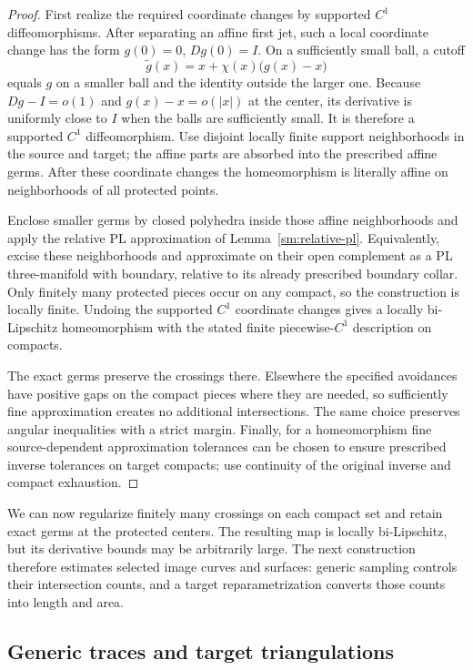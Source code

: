 \begin{proof}
First realize the required coordinate changes by supported $C^1$
diffeomorphisms.  After separating an affine first jet, such a local
coordinate change has the form $g(0)=0$, $Dg(0)=I$.  On a sufficiently
small ball, a cutoff
\[
 \widetilde g(x)=x+\chi(x)\bigl(g(x)-x\bigr)
\]
equals $g$ on a smaller ball and the identity outside the larger one.
Because $Dg-I=o(1)$ and $g(x)-x=o(|x|)$ at the center, its derivative
is uniformly close to $I$ when the balls are sufficiently small.
It is therefore a supported $C^1$ diffeomorphism.  Use disjoint
locally finite support neighborhoods in the source and target;
the affine parts are absorbed into the prescribed affine germs.
After these coordinate changes the homeomorphism is literally
affine on neighborhoods of all protected points.

Enclose smaller germs by closed polyhedra inside those affine
neighborhoods and apply the relative PL approximation of
Lemma~\ref{sm:relative-pl}.  Equivalently, excise these neighborhoods
and approximate on their open complement as a PL three-manifold
with boundary, relative to its already prescribed boundary collar.
Only finitely many protected pieces occur on any compact, so the
construction is locally finite.  Undoing the supported $C^1$
coordinate changes gives a locally bi-Lipschitz homeomorphism
with the stated finite piecewise-$C^1$ description on compacts.

The exact germs preserve the crossings there.  Elsewhere the
specified avoidances have positive gaps on the compact pieces
where they are needed, so sufficiently fine approximation creates
no additional intersections.  The same choice preserves angular
inequalities with a strict margin.  Finally, for a homeomorphism
fine source-dependent approximation tolerances can be chosen to
ensure prescribed inverse tolerances on target compacts; use
continuity of the original inverse and compact exhaustion.
\end{proof}


We can now regularize finitely many crossings on each compact set
and retain exact germs at the protected centers. The resulting map
is locally bi-Lipschitz, but its derivative bounds may be arbitrarily
large. The next construction therefore estimates selected image
curves and surfaces: generic sampling controls their intersection
counts, and a target reparametrization converts those counts into
length and area.

\subsection{Generic traces and target triangulations}

